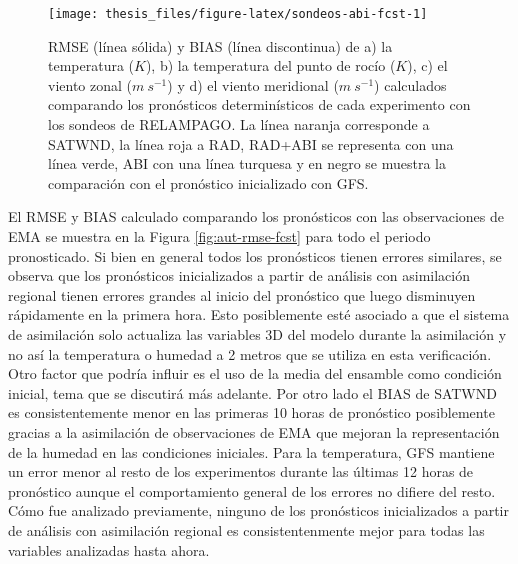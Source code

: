 \documentclass[12pt,oneside,a4paper]{reedthesis}
\begin{document}
\begin{figure}

{\centering \texttt{[image: thesis\_files/figure-latex/sondeos-abi-fcst-1]} 

}

\caption{RMSE (línea sólida) y BIAS (línea discontinua) de a) la temperatura (\(K\)), b) la temperatura del punto de rocío (\(K\)), c) el viento zonal (\(m\ s^{-1}\)) y d) el viento meridional (\(m\ s^{-1}\)) calculados comparando los pronósticos determinísticos de cada experimento con los sondeos de RELAMPAGO. La línea naranja corresponde a SATWND, la línea roja a RAD, RAD+ABI se representa con una línea verde, ABI con una línea turquesa y en negro se muestra la comparación con el pronóstico inicializado con GFS.}\label{fig:sondeos-abi-fcst}
\end{figure}
El RMSE y BIAS calculado comparando los pronósticos con las observaciones de EMA se muestra en la Figura \ref{fig:aut-rmse-fcst} para todo el periodo pronosticado. Si bien en general todos los pronósticos tienen errores similares, se observa que los pronósticos inicializados a partir de análisis con asimilación regional tienen errores grandes al inicio del pronóstico que luego disminuyen rápidamente en la primera hora. Esto posiblemente esté asociado a que el sistema de asimilación solo actualiza las variables 3D del modelo durante la asimilación y no así la temperatura o humedad a 2 metros que se utiliza en esta verificación. Otro factor que podría influir es el uso de la media del ensamble como condición inicial, tema que se discutirá más adelante. Por otro lado el BIAS de SATWND es consistentemente menor en las primeras 10 horas de pronóstico posiblemente gracias a la asimilación de observaciones de EMA que mejoran la representación de la humedad en las condiciones iniciales. Para la temperatura, GFS mantiene un error menor al resto de los experimentos durante las últimas 12 horas de pronóstico aunque el comportamiento general de los errores no difiere del resto. Cómo fue analizado previamente, ninguno de los pronósticos inicializados a partir de análisis con asimilación regional es consistentenmente mejor para todas las variables analizadas hasta ahora.
\end{document}
